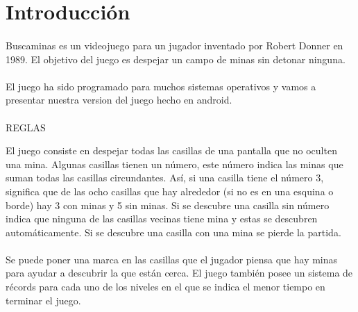 \documentclass[../documentacion_buscaminas2013.tex]{subfiles}
\begin{document}
\section{Introducción}

\paragraph{ }
Buscaminas es un videojuego para un jugador inventado por Robert Donner en 1989. El objetivo del juego es despejar un campo de minas sin detonar ninguna.
\paragraph{ }
El juego ha sido programado para muchos sistemas operativos y vamos a presentar nuestra version del juego hecho en android.
\paragraph{ }
REGLAS

El juego consiste en despejar todas las casillas de una pantalla que no oculten una mina. Algunas casillas tienen un número, este número indica las minas que suman todas las casillas circundantes. Así, si una casilla tiene el número 3, significa que de las ocho casillas que hay alrededor (si no es en una esquina o borde) hay 3 con minas y 5 sin minas. Si se descubre una casilla sin número indica que ninguna de las casillas vecinas tiene mina y estas se descubren automáticamente. Si se descubre una casilla con una mina se pierde la partida.

\paragraph{ }
Se puede poner una marca en las casillas que el jugador piensa que hay minas para ayudar a descubrir la que están cerca. El juego también posee un sistema de récords para cada uno de los niveles en el que se indica el menor tiempo en terminar el juego.

\clearpage
\end{document}
